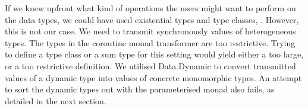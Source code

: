 If we knew upfront what kind of operations the users might want to perform on the data types, we could have used existential types and type classes, \viz \cite{Laufer:1994:PTI:186025.186031,Kiselyov:2004:STH:1017472.1017488}.
However, this is not our case.
We need to transmit synchronously values of heterogeneous types.
The types in the coroutine monad transformer are too restrictive.
Trying to define a type class or a sum type for this setting would yield either a too large, or a too restrictive definition.
%
We utilised \textsf{Data.Dynamic} to convert transmitted values of a dynamic type into values of concrete monomorphic types.
An attempt to sort the dynamic types out with the parameterised monad also fails, as detailed in the next section.

